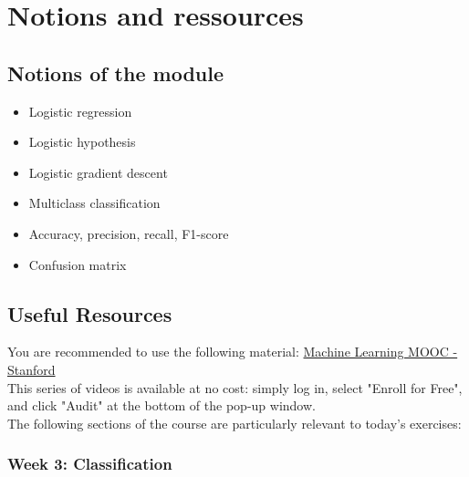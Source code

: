 

\chapter*{Notions and ressources}

\section*{Notions of the module}
\begin{itemize}
  \item Logistic regression
  \item Logistic hypothesis
  \item Logistic gradient descent
  \item Multiclass classification
  \item Accuracy, precision, recall, F1-score
  \item Confusion matrix
\end{itemize}
  
\section*{Useful Resources}

You are recommended to use the following material: \href{https://www.coursera.org/learn/machine-learning}{Machine Learning MOOC - Stanford}\\
\newline
This series of videos is available at no cost: simply log in, select "Enroll for Free", and click "Audit" at the bottom of the pop-up window.\\
\newline
The following sections of the course are particularly relevant to today's exercises: 

\subsection*{Week 3: Classification}

